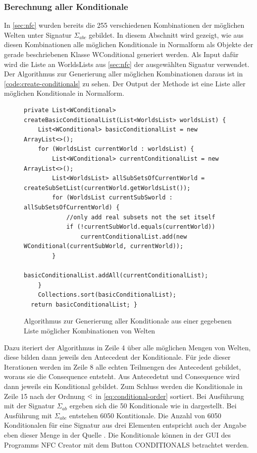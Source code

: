 \documentclass[12pt,a4paper]{article}
\newcommand\dotl{\mathrel{%
    \mathchoice{\QEQ}{\QEQ}{\QEQ}{\QEQ}%
}}
\def\QEQ{{%
    \setbox0\hbox{<}%
    \rlap{\hbox to \wd0{\hss \raisebox {0.1pt}{$\ \cdot$\hss}}}\box0
}}
\begin{document}
\subsubsection{Berechnung aller Konditionale}



In \autoref{sec:nfc} wurden bereits die 255 verschiedenen Kombinationen der möglichen Welten unter Signatur $\Sigma_{abc}$ gebildet. In diesem Abschnitt wird gezeigt, wie aus diesen Kombinationen alle möglichen Konditionale in Normalform als Objekte der gerade beschriebenen Klasse WConditional generiert werden. Als Input dafür wird die Liste an WorldsLists aus \autoref{sec:nfc} der ausgewählten Signatur verwendet. Der Algorithmus zur Generierung aller möglichen Kombinationen daraus ist in \autoref{code:create-conditionals} zu sehen. Der Output der Methode ist eine Liste aller möglichen Konditionale in Normalform. 



\begin{figure}
\begin{lstlisting}
private List<WConditional> createBasicConditionalList(List<WorldsList> worldsList) {
    List<WConditional> basicConditionalList = new ArrayList<>();
    for (WorldsList currentWorld : worldsList) {
        List<WConditional> currentConditionalList = new ArrayList<>();
        List<WorldsList> allSubSetsOfCurrentWorld = createSubSetList(currentWorld.getWorldsList());
        for (WorldsList currentSubSworld : allSubSetsOfCurrentWorld) {
            //only add real subsets not the set itself
            if (!currentSubWorld.equals(currentWorld))
                currentConditionalList.add(new WConditional(currentSubWorld, currentWorld));
        }
        basicConditionalList.addAll(currentConditionalList);
    }
    Collections.sort(basicConditionalList);
  return basicConditionalList; }
\end{lstlisting}
\caption{Algorithmus zur Generierung aller Konditionale aus einer gegebenen Liste möglicher Kombinationen von Welten}
\label{code:create-conditionals}
\end{figure} 


Dazu iteriert der Algorithmus in Zeile 4 über alle möglichen Mengen von Welten, diese bilden dann jeweils den Antecedent der Konditionale. Für jede dieser Iterationen werden im Zeile 8 alle echten Teilmengen des Antecedent gebildet, woraus sie die Consequence entsteht. Aus Antecedetnt und Consequence wird dann jeweils ein Konditional gebildet. Zum Schluss werden die Konditionale in Zeile 15 nach der Ordnung $\dotl$ in \autoref{eq:conditional-order} sortiert. Bei Ausführung mit der Signatur $\Sigma_{ab}$ ergeben sich die 50 Konditionale wie in \cite{beierle19} dargestellt. Bei Ausführung mit $\Sigma_{abc}$ entstehen 6050 Kontitionale. Die Anzahl von 6050 Konditionalen für eine Signatur aus drei Elementen entspricht auch der Angabe eben dieser Menge in  der Quelle \cite{beierle19b}. Die Konditionale können in der GUI des Programms NFC Creator mit dem Button CONDITIONALS betrachtet werden.
\end{document}
